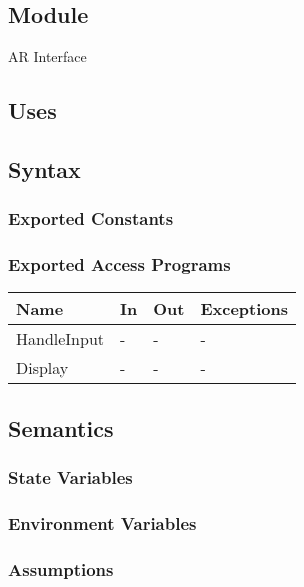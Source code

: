 \documentclass[12pt, titlepage]{article}
\begin{document}
\begin{itemize}
\subsection{Module}

AR Interface

\subsection{Uses}

\subsection{Syntax}

\subsubsection{Exported Constants}

\subsubsection{Exported Access Programs}

\begin{center}
\begin{tabular}{p{2cm} p{4cm} p{4cm} p{2cm}}
\hline
\textbf{Name} & \textbf{In} & \textbf{Out} & \textbf{Exceptions} \\
\hline
HandleInput & - & - & - \\
Display & - & - & - \\

\hline
\end{tabular}
\end{center}

\subsection{Semantics}

\subsubsection{State Variables}

\subsubsection{Environment Variables}

\subsubsection{Assumptions}


\end{itemize}
\end{document}
